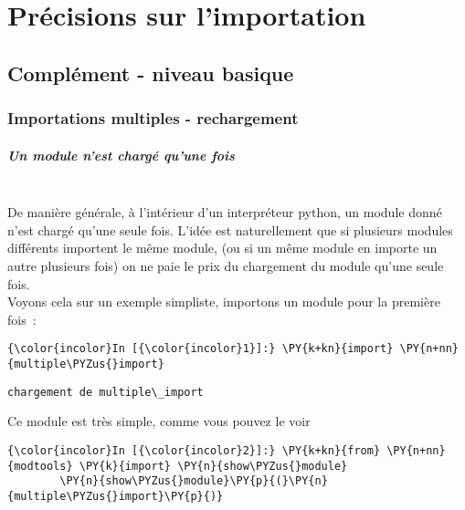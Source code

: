     \hypertarget{pruxe9cisions-sur-limportation}{%
\section{Précisions sur
l'importation}\label{pruxe9cisions-sur-limportation}}

    \hypertarget{compluxe9ment---niveau-basique}{%
\subsection{Complément - niveau
basique}\label{compluxe9ment---niveau-basique}}

    \hypertarget{importations-multiples---rechargement}{%
\subsubsection{Importations multiples -
rechargement}\label{importations-multiples---rechargement}}

    \hypertarget{un-module-nest-charguxe9-quune-fois}{%
\subparagraph{Un module n'est chargé qu'une
fois\\\\}\label{un-module-nest-charguxe9-quune-fois}}

    De manière générale, à l'intérieur d'un interpréteur python, un module
donné n'est chargé qu'une seule fois. L'idée est naturellement que si
plusieurs modules différents importent le même module, (ou si un même
module en importe un autre plusieurs fois) on ne paie le prix du
chargement du module qu'une seule fois.\\

Voyons cela sur un exemple simpliste, importons un module pour la
première fois~:

    \begin{Verbatim}[commandchars=\\\{\}]
{\color{incolor}In [{\color{incolor}1}]:} \PY{k+kn}{import} \PY{n+nn}{multiple\PYZus{}import}
\end{Verbatim}


    \begin{Verbatim}[commandchars=\\\{\}]
chargement de multiple\_import

    \end{Verbatim}

    Ce module est très simple, comme vous pouvez le voir

    \begin{Verbatim}[commandchars=\\\{\}]
{\color{incolor}In [{\color{incolor}2}]:} \PY{k+kn}{from} \PY{n+nn}{modtools} \PY{k}{import} \PY{n}{show\PYZus{}module}
        \PY{n}{show\PYZus{}module}\PY{p}{(}\PY{n}{multiple\PYZus{}import}\PY{p}{)}
\end{Verbatim}


